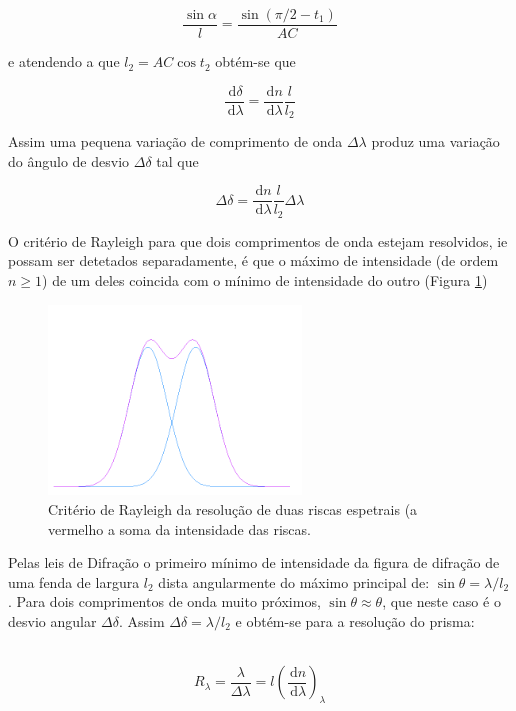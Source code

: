 \documentclass[a4paper,12pt]{article}  %
\newcommand{\ud}{\,\mathrm{d}}
\begin{document}
\begin{equation}
	\label{eq:sin_alpha}
	\frac{\sin \alpha}{l}= \frac{\sin (\pi/2 - t_1)} {AC}
\end{equation}

e atendendo a que $l_2= AC \cos t_2$  obtém-se que 

\begin{equation}
	\label{eq:delt_lamd}
	\frac{\ud \delta}{\ud \lambda}  =  \frac{\ud n}{\ud \lambda} \frac{l}{l_2}
\end{equation}

Assim uma pequena variação de comprimento de onda $\Delta \lambda$ produz uma variação do ângulo de desvio $\Delta \delta$  tal que 

\begin{equation}
	\label{eq:Delt_delta}
	\Delta \delta =  \frac{\ud n}{\ud \lambda} \frac{l}{l_2} \Delta \lambda 
\end{equation}

O critério de Rayleigh para que dois comprimentos de onda estejam resolvidos, ie possam ser detetados separadamente, é que o máximo de intensidade (de ordem $n \ge 1$) de um deles coincida com o mínimo de intensidade do outro (Figura \ref{fig:gauss})

\begin{figure}[ht]  \centering 
	\includegraphics[width=0.6\textwidth]{gauss}
	\caption{Critério de Rayleigh da resolução de duas riscas espetrais (a vermelho a soma da intensidade das riscas. \label{fig:gauss}} 
\end{figure}

Pelas leis de Difração o primeiro mínimo de intensidade da figura de difração de uma fenda de largura $l_2$ dista angularmente do máximo principal de:  $\sin \theta = \lambda/l_2$.
Para dois comprimentos de onda muito próximos, $\sin  \theta \approx \theta $, que neste caso é o desvio angular $\Delta \delta$. Assim $\Delta \delta= \lambda / l_2$ e obtém-se para a resolução do prisma: 

~\begin{equation}
	\label{eq:resolup}
	R_\lambda  =  \frac{\lambda}{\Delta \lambda} = l \left(\frac{\ud n}{\ud \lambda} \right )_\lambda 
\end{equation}
\end{document}
